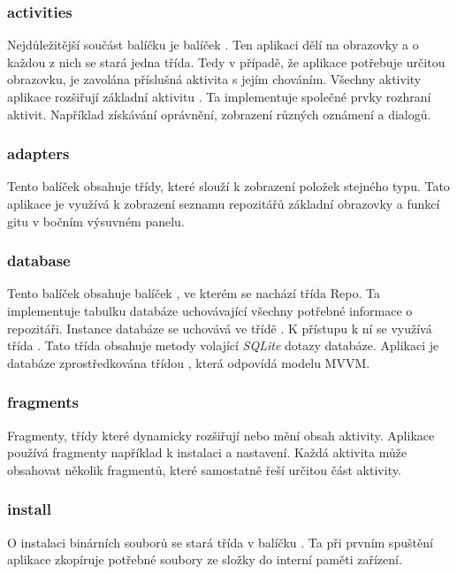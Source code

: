     \newpage
    \subsubsection{activities}
    Nejdůležitější součást balíčku  je balíček . Ten aplikaci dělí na obrazovky a o každou z nich se stará jedna třída. Tedy v případě, že aplikace potřebuje určitou obrazovku, je zavolána příslušná aktivita s jejím chováním. Všechny aktivity aplikace rozšiřují základní aktivitu . Ta implementuje společné prvky rozhraní aktivit. Například získávání oprávnění, zobrazení různých oznámení a dialogů.

    \subsubsection{adapters}
    Tento balíček obsahuje třídy, které slouží k zobrazení položek stejného typu. Tato aplikace je využívá k zobrazení seznamu repozitářů základní obrazovky a funkcí gitu v bočním výsuvném panelu.  

    \subsubsection{database}
    Tento balíček obsahuje balíček , ve kterém se nachází třída Repo. Ta implementuje tabulku databáze uchovávající všechny potřebné informace o repozitáři. Instance databáze se uchovává ve třídě . K přístupu k ní se využívá třída . Tato třída obsahuje metody volající \emph{SQLite} dotazy databáze. Aplikaci je databáze zprostředkována třídou , která odpovídá  modelu MVVM.

    \subsubsection{fragments}
    Fragmenty, třídy které dynamicky rozšiřují nebo mění obsah aktivity. Aplikace používá fragmenty například k instalaci a nastavení. Každá aktivita může obsahovat několik fragmentů, které samostatně řeší určitou část aktivity.

    \subsubsection{install}
    O instalaci binárních souborů se stará třída  v balíčku . Ta při prvním spuštění aplikace zkopíruje potřebné soubory ze složky  do interní paměti zařízení.

